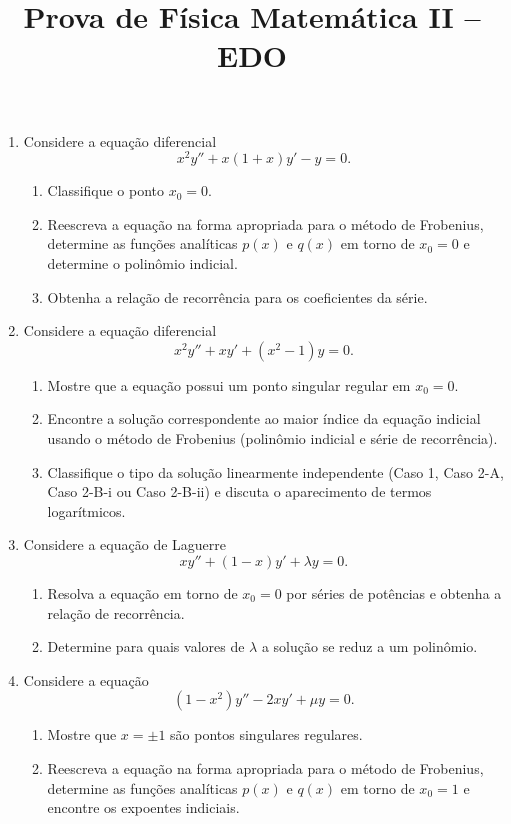 \newif\ifuseseminar
\useseminartrue


\title{Prova de Física Matemática II -- EDO}



\begin{enumerate}

	\item Considere a equação diferencial
	      $$
		      x^2 y'' + x(1+x)y' - y = 0.
	      $$
	      \begin{enumerate}
		      \item Classifique o ponto $x_0 = 0$.
		      \item Reescreva a equação na forma apropriada para o método de Frobenius,
		            determine as funções analíticas $p(x)$ e $q(x)$ em torno de $x_0 =
			            0$ e determine o polinômio indicial.
		      \item Obtenha a relação de recorrência para os coeficientes da série.
	      \end{enumerate}

	\item Considere a equação diferencial
	      $$
		      x^2 y'' + xy' + (x^2 - 1)y = 0.
	      $$
	      \begin{enumerate}
		      \item Mostre que a equação possui um ponto singular regular em $x_0 = 0$.
		      \item Encontre a solução correspondente ao maior índice da equação
		            indicial usando o método de Frobenius (polinômio indicial e série
		            de recorrência).
		      \item Classifique o tipo da solução linearmente independente (Caso 1,
		            Caso 2-A, Caso 2-B-i ou Caso 2-B-ii) e discuta o aparecimento de
		            termos logarítmicos.
	      \end{enumerate}

	\item Considere a equação de Laguerre
	      $$
		      xy'' + (1-x)y' + \lambda y = 0.
	      $$
	      \begin{enumerate}
		      \item Resolva a equação em torno de $x_0 = 0$ por séries de potências e
		            obtenha a relação de recorrência.
		      \item Determine para quais valores de $\lambda$ a solução se reduz a um
		            polinômio.
	      \end{enumerate}

	\item Considere a equação
	      $$
		      (1-x^2)y'' - 2xy' + \mu y = 0.
	      $$
	      \begin{enumerate}
		      \item Mostre que $x=\pm1$ são pontos singulares regulares.
		      \item Reescreva a equação na forma apropriada para o método de Frobenius,
		            determine as funções analíticas $p(x)$ e $q(x)$ em torno de $x_0 =
			            1$ e encontre os expoentes indiciais.
	      \end{enumerate}

\end{enumerate}


